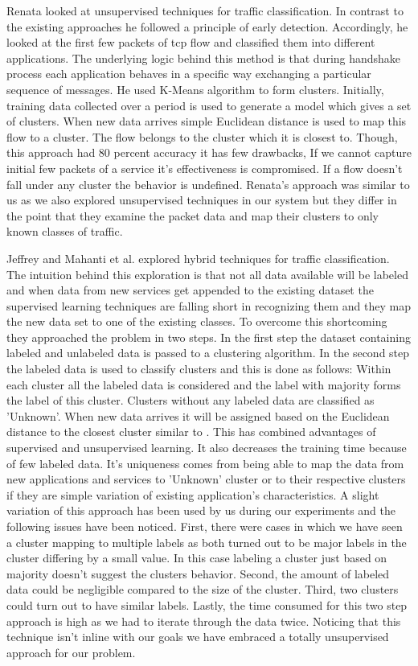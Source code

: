 Renata\cite{bernaille2006traffic} looked at unsupervised techniques for traffic classification. In contrast to the existing approaches he followed a principle of early detection. Accordingly, he looked at the first few packets of tcp flow and classified them into different applications. The underlying logic behind this method is that during handshake process each application behaves in a specific way exchanging a particular sequence of messages. 
He used K-Means algorithm to form clusters. Initially, training data collected over a period  is used to generate a model which gives a set of clusters. When new data arrives simple Euclidean distance is used to map this flow to a cluster. The flow belongs to the cluster which it is closest to. Though, this approach had 80 percent accuracy it has few drawbacks, If we cannot capture initial few packets of a service it's effectiveness is compromised. If a flow doesn't fall under any cluster the behavior is undefined.
Renata's \cite{bernaille2006traffic} approach was similar to us as we also explored unsupervised techniques in our system but they differ in the point that they examine the packet data and map their clusters to only known classes of traffic.

Jeffrey and Mahanti et al. \cite{erman2007semi} explored hybrid techniques for traffic classification. The intuition behind this exploration is that not all data available will be labeled and when data from new services get appended to the existing dataset the supervised learning techniques are falling short in recognizing them and they map the new data set to one of the existing classes. To overcome this shortcoming they approached the problem in two steps. In the first step the dataset containing labeled and unlabeled data is passed to a clustering algorithm. In the second step the labeled data is used to classify clusters and this is done as follows: Within each cluster all the labeled data is considered and the label with majority forms the label of this cluster. Clusters without any labeled data are classified as 'Unknown'. When new data arrives it will be assigned based on the Euclidean distance to the closest cluster similar to \cite{bernaille2006traffic} . This has combined advantages of supervised and unsupervised learning. It also decreases the training time because of few labeled data. It's uniqueness comes from being able to map the data from new applications and services to 'Unknown' cluster or to their respective clusters if they are simple variation of existing application's characteristics. A slight variation of this approach has been used by us during our experiments and the following issues have been noticed. First, there were cases in which we have seen a cluster mapping to multiple labels as both turned out to be major labels in the cluster differing by a small value. In this case labeling a cluster just based on majority doesn't suggest the clusters behavior. Second, the amount  of labeled data could be negligible compared to the size of the cluster. Third, two clusters could turn out to have similar labels. Lastly, the time consumed for this two step approach is high as we had to iterate through the data twice. Noticing that this technique isn't inline with  our goals we have embraced a totally unsupervised approach for our problem.


